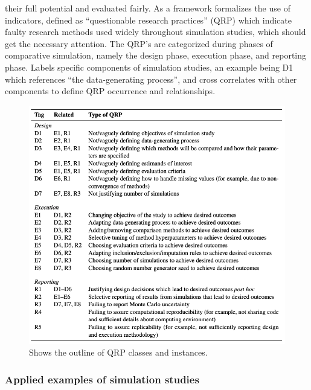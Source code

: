 their full potential and evaluated fairly. As a framework \parencite{pawel_pitfalls_2024} formalizes the use of indicators, defined as “questionable research practices” (QRP) which indicate faulty research methods used widely throughout simulation studies, which should get the necessary attention. The QRP’s are categorized during phases of comparative simulation, namely the design phase, execution phase, and reporting phase. \parencite{pawel_pitfalls_2024} Labels specific components of simulation studies, an example being D1 which references “the data-generating process”, and cross correlates with other components to define QRP occurrence and relationships.

\begin{figure}[h]
	\includegraphics[scale=0.5]{Figures/QRPSUMMARY.png}
	\caption{Shows the outline of QRP classes and instances. \parencite{pawel_pitfalls_2024}}
\end{figure}

\subsubsection{Applied examples of simulation studies}

